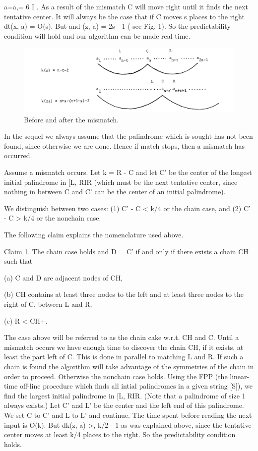 \documentclass[11pt,a4paper]{report}
\begin{document}
a=a,= 6 I . As a result of the mismatch C will move right until it finds the next
tentative center. It will always be the case that if C moves s places to the right dt(x, a) =
O(s). But  and (z, a) = 2s - 1 ( see Fig. 1). So the predictability condition will hold and
our algorithm can be made real time.

\begin{figure}[h]
    \centerline{\includegraphics{./images/1.png}}
    \caption{Before and after the mismatch.}
    \label{fig}
\end{figure}


In the sequel we always assume that the palindrome which is sought has not been
found, since otherwise we are done. Hence if match stops, then a mismatch has occurred.

Assume a mismatch occurs. Let k = R - C and let C’ be the center of the longest
initial palindrome in [L, RIR (which must be the next tentative center, since nothing in
between C and C’ can be the center of an initial palindrome).

We distinguish between two cases: (1) C’ - C < k/4 or the chain case, and (2)
C’ - C > k/4 or the nonchain case.

The following claim explains the nomenclature used above.

Claim 1. The chain case holds and D = C’ if and only if there exists a chain CH
such that

(a) C and D are adjacent nodes of CH,

(b) CH contains at least three nodes to the left and at least three nodes to the
right of C, between L and R,

(c) R < CH+.

The case above will be referred to as the chain cake w.r.t. CH and C. Until a mismatch
occurs we have enough time to discover the chain CH, if it exists, at least the part left
of C. This is done in parallel to matching L and R. If such a chain is found the algorithm
will take advantage of the symmetries of the chain in order to proceed. Otherwise the
nonchain case holds. Using the FPP (the linear-time off-line procedure which finds
all intial palindromes in a given string [S]), we find the largest initial palindrome in [L, RIR.
(Note that a palindrome of size 1 always exists.) Let C’ and L’ be the center and the left
end of this palindrome. We set C to C’ and L to L’ and continue. The time spent before
reading the next input is O(k). But dk(z, a) >, k/2 - 1 as was explained above, since
the tentative center moves at least k/4 places to the right. So the predictability condition
holds. 
\end{document}
